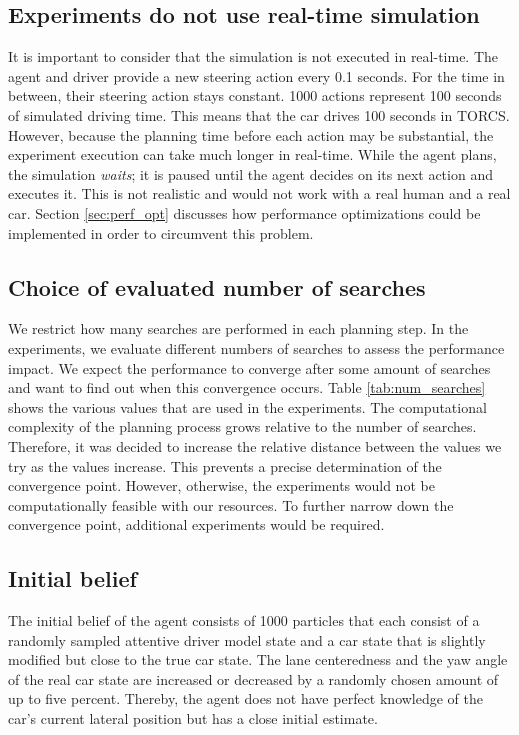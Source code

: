 \subsection{Experiments do not use real-time simulation}

It is important to consider that the simulation is not executed in real-time. The agent and driver provide a new steering action every 0.1 seconds. For the time in between, their steering action stays constant. 1000 actions represent 100 seconds of simulated driving time. This means that the car drives 100 seconds in TORCS. However, because the planning time before each action may be substantial, the experiment execution can take much longer in real-time. While the agent plans, the simulation \emph{waits}; it is paused until the agent decides on its next action and executes it. This is not realistic and would not work with a real human and a real car. Section \ref{sec:perf_opt} discusses how performance optimizations could be implemented in order to circumvent this problem. 

\subsection{Choice of evaluated number of searches}

 

We restrict how many searches are performed in each planning step. In the experiments, we evaluate different numbers of searches to assess the performance impact. We expect the performance to converge after some amount of searches and want to find out when this convergence occurs. Table \ref{tab:num_searches} shows the various values that are used in the experiments. The computational complexity of the planning process grows relative to the number of searches. Therefore, it was decided to increase the relative distance between the values we try as the values increase. This prevents a precise determination of the convergence point. However, otherwise, the experiments would not be computationally feasible with our resources. To further narrow down the convergence point, additional experiments would be required.

\subsection{Initial belief}

The initial belief of the agent consists of 1000 particles that each consist of a randomly sampled attentive driver model state and a car state that is slightly modified but close to the true car state. The lane centeredness and the yaw angle of the real car state are increased or decreased by a randomly chosen amount of up to five percent. Thereby, the agent does not have perfect knowledge of the car's current lateral position but has a close initial estimate.

